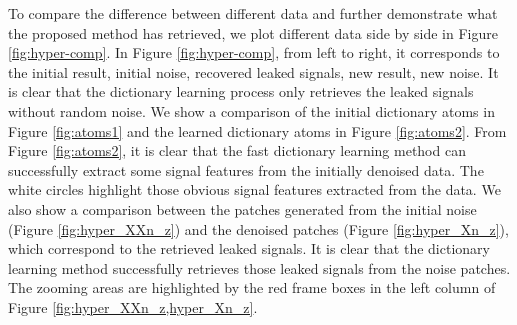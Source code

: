 To compare the difference between different data and further demonstrate what the proposed method has retrieved, we plot different data side by side in Figure \ref{fig:hyper-comp}. In Figure \ref{fig:hyper-comp}, from left to right, it corresponds to the initial result, initial noise, recovered leaked signals, new result, new noise. It is clear that the dictionary learning process only retrieves the leaked signals without random noise. We show a comparison of the initial dictionary atoms in Figure \ref{fig:atoms1} and the learned dictionary atoms in Figure \ref{fig:atoms2}. From Figure \ref{fig:atoms2}, it is clear that the fast dictionary learning method can successfully extract some signal features from the initially denoised data. The white circles highlight those obvious signal features extracted from the data. We also show a comparison between the patches generated from the initial noise (Figure \ref{fig:hyper_XXn_z}) and the denoised patches (Figure \ref{fig:hyper_Xn_z}), which correspond to the retrieved leaked signals.  It is clear that the dictionary learning method successfully retrieves those leaked signals from the noise patches. The zooming areas are highlighted by the red frame boxes in the left column of Figure \ref{fig:hyper_XXn_z,hyper_Xn_z}.
